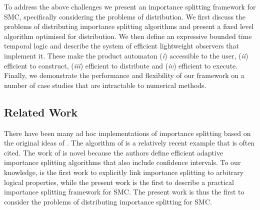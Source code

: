 \documentclass{llncs}
\begin{document}
\smallskip{}


To address the above challenges we present an importance splitting
framework for SMC, specifically considering the problems of distribution.
We first discuss the problems of distributing importance splitting
algorithms and present a fixed level algorithm optimised for distribution.
We then define an expressive bounded time temporal logic and describe
the system of efficient lightweight observers that implement it. These
make the product automaton (\emph{i}) accessible to the user, (\emph{ii})
efficient to construct, (\emph{iii}) efficient to distribute and (\emph{iv})
efficient to execute. Finally, we demonstrate the performance and
flexibility of our framework on a number of case studies that are
intractable to numerical methods.


\subsection*{Related Work}

There have been many ad hoc implementations of importance splitting
based on the original ideas of \cite{KahnHarris1951,KahnMarshall1953}.
The algorithm of \cite{Villen-Altamirano1991} is a relatively recent
example that is often cited. The work of \cite{CerouGuyader2007,CerouDelMoralFuronGuyader2012}
is novel because the authors define efficient adaptive importance
splitting algorithms that also include confidence intervals. To our
knowledge, \cite{JegourelLegaySedwards2013} is the first work to
explicitly link importance splitting to arbitrary logical properties,
while the present work is the first to describe a practical importance
splitting framework for SMC. The present work is thus the first to
consider the problems of distributing importance splitting for SMC.
\end{document}
